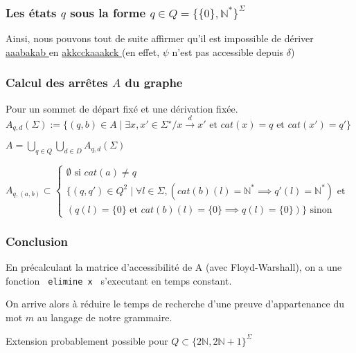 \documentclass[12pt]{beamer}
\begin{document}
\begin{frame}\frametitle{Les états $q$ sous la forme $q \in Q = \{\{0\},\mathbb{N}^*\}^{\Sigma}$}


Ainsi, nous pouvons tout de suite affirmer qu'il est impossible de dériver \underline{ aaabakab } en \underline{ akkcckaaakck } (en effet, $\psi$ n'est pas accessible depuis $\delta$)

\end{frame}

\begin{frame}\frametitle{Calcul des arrêtes $A$ du graphe}
Pour un sommet de départ fixé et une dérivation fixée.
$A_{q,d}(\Sigma) := \{(q,b) \in A \mid \exists x,x' \in \Sigma^\star / x \overset{d}{\rightarrow} x' \text{ et } cat(x) = q \text{ et } cat(x') = q'\}$

$A = \bigcup_{q \in Q}  \bigcup_{d \in D} A_{q,d}(\Sigma)$

$
A_{q,(a,b)} \subset
\begin{cases}
\emptyset \text{ si } cat(a) \neq q\\
\{ (q,q') \in Q^2 \mid \forall l \in \Sigma,
    (cat(b)(l)=\mathbb{N}^* \implies q'(l)=\mathbb{N}^*) \text{ et }\\
    (q(l)=\{0\} \text{ et } cat(b)(l) = \{0\} \implies q(l)=\{0\}) 
\}
\text{ sinon}
\end{cases}
$

\end{frame}

\begin{frame}\frametitle{Conclusion}
En précalculant la matrice d'accessibilité de A (avec Floyd-Warshall), on a une fonction \texttt{ elimine x } s'executant en temps constant.

On arrive alors à réduire le temps de recherche d'une preuve d'appartenance du mot $m$ au langage de notre grammaire.

Extension probablement possible pour $Q \subset \{2 \mathbb{N} , 2 \mathbb{N} + 1 \}^\Sigma$
\end{frame}
\end{document}
